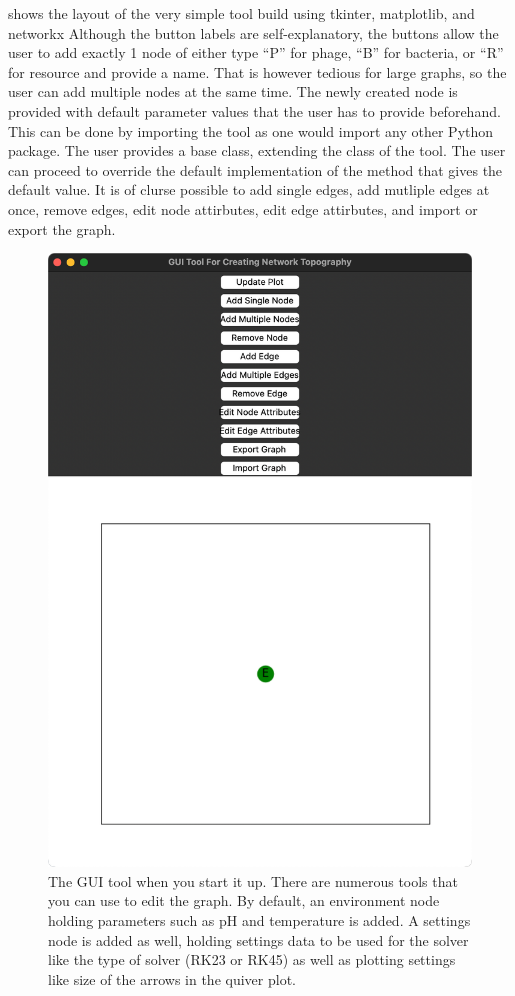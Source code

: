  shows the layout of the very simple tool build using tkinter, matplotlib, and networkx %
Although the button labels are self-explanatory, the buttons allow the user to add exactly 1 node of either type “P” for phage, “B” for bacteria, or “R” for resource and provide a name. 
That is however tedious for large graphs, so the user can add multiple nodes at the same time. 
The newly created node is provided with default parameter values that the user has to provide beforehand. 
This can be done by importing the tool as one would import any other Python package. 
The user provides a base class, extending the class of the tool. 
The user can proceed to override the default implementation of the method that gives the default value. 
It is of clurse possible to add single edges, add mutliple edges at once, remove edges, edit node attirbutes, edit edge attirbutes, and import or export the graph. 

\begin{figure}
    \centering
    \includegraphics[width=0.5\linewidth]{Screenshots/initial_startup_GUI_tool.png}
    \caption{The GUI tool when you start it up. There are numerous tools that you can use to edit the graph. By default, an environment node holding parameters such as pH and temperature is added. A settings node is added as well, holding settings data to be used for the solver like the type of solver (RK23 or RK45) as well as plotting settings like size of the arrows in the quiver plot. }
    \label{fig:ss:initial_startup_GUI_tool}
\end{figure}


